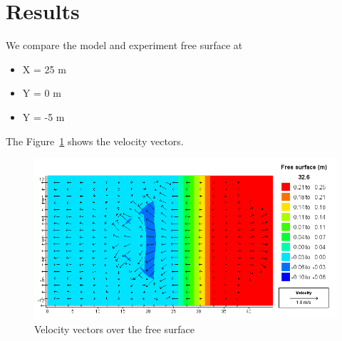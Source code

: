 \section{Results}
We compare the model and experiment free surface at
\begin{itemize}
  \item X = 25 m
  \item Y =  0 m
  \item Y = -5 m
\end{itemize}

The Figure~\ref{fig:triang:vel} shows the velocity vectors.
\begin{figure}
\centering
\includegraphics[width=.6\textwidth]{img/vel.png}
\caption{Velocity vectors over the free surface}\label{fig:triang:vel}
\end{figure}

